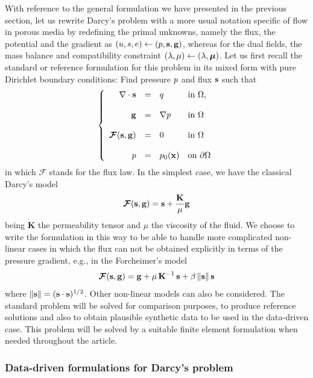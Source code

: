 With reference to the general formulation we have presented in the
previous section, let us rewrite Darcy's problem with a more usual
notation specific of flow in porous media by redefining the primal
unknowns, namely the flux, the potential and the gradient
as $(u, s, e) \leftarrow (p, \mathbf{s}, \mathbf{g})$, whereas for the dual fields,
the mass balance and compatibility constraint $(\lambda, \mu) \leftarrow (\lambda, \boldsymbol{\mu})$.
Let us first recall the standard or reference formulation for this
problem in its mixed form with pure Dirichlet
boundary conditions: Find pressure $p$ and flux $\mathbf{s}$ such that
\begin{equation}
\left\lbrace
\begin{array}{rcll}
\nabla \cdot \mathbf{s} &=& q & \mbox{in}~\Omega,\\
\\
\mathbf{g} &=& \nabla{p} & \mbox{in}~\Omega \\
\\
\boldsymbol{\mathcal{F}}(\mathbf{s},\mathbf{g}) &=& 0 & \mbox{in}~\Omega \\
\\
p &=& p_0(\mathbf{x}) & \mbox{on}~\partial\Omega
\end{array}
\right. \label{eq:poisson_general}
\end{equation}
in which $\boldsymbol{\mathcal{F}}$ stands for the flux law.
In the simplest case, we have the classical Darcy's model
$$
\boldsymbol{\mathcal{F}}(\mathbf{s},\mathbf{g}) = \mathbf{s}  + \dfrac{\mathbf{K}}{\mu} \mathbf{g}\\
$$
being $\mathbf{K}$ the permeability tensor and $\mu$ the viscosity of the fluid.
We choose to write the formulation in this way to be able
to handle more complicated non-linear cases in which the flux
can not be obtained explicitly in terms of the pressure gradient,
e.g., in the Forcheimer's model
$$
\boldsymbol{\mathcal{F}}(\mathbf{s},\mathbf{g}) = \mathbf{g} + \mu\,\mathbf{K}^{-1}\,\mathbf{s} +
\beta \,\|\mathbf{s} \|\, \mathbf{s}
$$
where $\| \mathbf{s} \| = (\mathbf{s} \cdot \mathbf{s})^{1/2}$. 
Other non-linear models can also be considered. 
The standard problem will be solved for comparison purposes,
to produce reference solutions
and also to obtain plausible synthetic data to be used in the
data-driven case. This problem will be solved by a suitable
finite element formulation when needed throughout the article. 

\subsubsection{Data-driven formulations for Darcy's problem}

